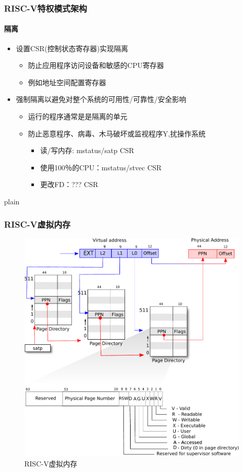 \documentclass[UTF8]{ctexbeamer}
\begin{document}
\begin{frame}
	\frametitle{RISC-V特权模式架构}
	\framesubtitle{隔离}

	\begin{itemize}
		\item 设置CSR(控制状态寄存器)实现隔离
		\begin{itemize}
			\item 防止应用程序访问设备和敏感的CPU寄存器
			\item 例如地址空间配置寄存器
		\end{itemize} 
	\end{itemize}

	\begin{itemize}
		\item 强制隔离以避免对整个系统的可用性/可靠性/安全影响
		\begin{itemize}
		\item 运行的程序通常是是隔离的单元
		\item 防止恶意程序、病毒、木马破坏或监视程序Y,扰操作系统	
			\begin{itemize}
			\item 读/写内存: mstatus/satp CSR
			\item 使用100％的CPU：mstatus/stvec CSR
			\item 更改FD：??? CSR
			\end{itemize}
		\end{itemize}
	\end{itemize}

\end{frame}



\begin{frame}{plain}
	
	\frametitle{RISC-V虚拟内存}
	
	\begin{figure}
		\centering
		\includegraphics[width=0.65\linewidth]{riscv_pagetable}
		\caption{RISC-V虚拟内存}
	\end{figure}
	
	
\end{frame}
\end{document}
